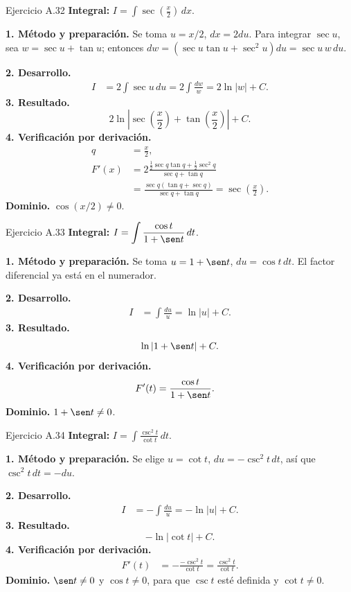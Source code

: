 \begin{examplebox}{Ejercicio A.32}
\textbf{Integral:} $\displaystyle I=\int \sec\left(\frac x2\right)\,dx$.

\textbf{1. Método y preparación.} Se toma $u=x/2$, $dx=2du$. Para integrar $\sec u$, sea $w=\sec u+\tan u$; entonces $dw=(\sec u\tan u+\sec^2u)du=\sec u\,w\,du$.

\textbf{2. Desarrollo.}
\begin{align*}
I&=2\int\sec u\,du=2\int\frac{dw}{w}=2\ln|w|+C.
\end{align*}
\textbf{3. Resultado.}
\[
2\ln\left|\sec\left(\frac x2\right)+\tan\left(\frac x2\right)\right|+C.
\]
\textbf{4. Verificación por derivación.}
\begin{align*}
q&=\frac x2,\\F'(x)&=2\frac{\tfrac12\sec q\tan q+\tfrac12\sec^2q}{\sec q+\tan q}\\&=\frac{\sec q(\tan q+\sec q)}{\sec q+\tan q}=\sec\left(\frac x2\right).
\end{align*}
\textbf{Dominio.} $\cos(x/2)\ne0$.
\end{examplebox}

\begin{examplebox}{Ejercicio A.33}
\textbf{Integral:} $\displaystyle I=\int \frac{\cos t}{1+\sen t}\,dt$.

\textbf{1. Método y preparación.} Se toma $u=1+\sen t$, $du=\cos t\,dt$. El factor diferencial ya está en el numerador.

\textbf{2. Desarrollo.}
\begin{align*}
I&=\int\frac{du}{u}=\ln|u|+C.
\end{align*}
\textbf{3. Resultado.}
\[
\ln|1+\sen t|+C.
\]
\textbf{4. Verificación por derivación.}
\begin{align*}
F'(t)&=\frac{\cos t}{1+\sen t}.
\end{align*}
\textbf{Dominio.} $1+\sen t\ne0$.
\end{examplebox}

\begin{examplebox}{Ejercicio A.34}
\textbf{Integral:} $\displaystyle I=\int \frac{\csc^2t}{\cot t}\,dt$.

\textbf{1. Método y preparación.} Se elige $u=\cot t$, $du=-\csc^2t\,dt$, así que $\csc^2t\,dt=-du$.

\textbf{2. Desarrollo.}
\begin{align*}
I&=-\int\frac{du}{u}=-\ln|u|+C.
\end{align*}
\textbf{3. Resultado.}
\[
-\ln|\cot t|+C.
\]
\textbf{4. Verificación por derivación.}
\begin{align*}
F'(t)&=-\frac{-\csc^2t}{\cot t}=\frac{\csc^2t}{\cot t}.
\end{align*}
\textbf{Dominio.} $\sen t\ne0$ y $\cos t\ne0$, para que $\csc t$ esté definida y $\cot t\ne0$.
\end{examplebox}

